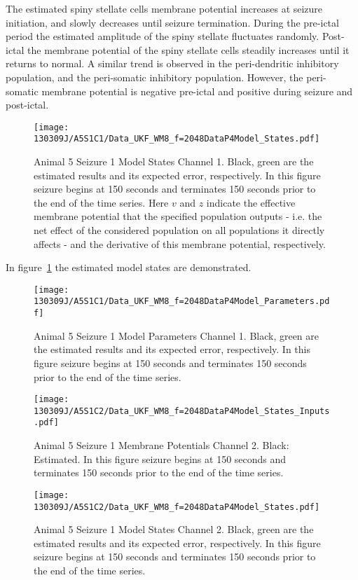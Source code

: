The estimated spiny stellate cells membrane potential increases at seizure initiation, and slowly decreases until seizure termination. During the pre-ictal period the estimated amplitude of the spiny stellate fluctuates randomly. Post-ictal the membrane potential of the spiny stellate cells steadily increases until it returns to normal. A similar trend is observed in the peri-dendritic inhibitory population, and the peri-somatic inhibitory population. However, the peri-somatic membrane potential is negative pre-ictal and positive during seizure and post-ictal.

\begin{figure}
	\centering
		\texttt{[image: 130309J/A5S1C1/Data\_UKF\_WM8\_f=2048DataP4Model\_States.pdf]}
	\caption{Animal 5 Seizure 1 Model States Channel 1. Black, green are the estimated results and its expected error, respectively. In this figure seizure begins at 150 seconds and terminates 150 seconds prior to the end of the time series. Here $v$ and $z$ indicate the effective membrane potential that the specified population outputs - i.e. the net effect of the considered population on all populations it directly affects - and the derivative of this membrane potential, respectively.}
	\label{fig: A5S1C1 MS}
\end{figure}

In figure~\ref{fig: A5S1C1 MS} the estimated model states are demonstrated. 

\begin{figure}
	\centering
		\texttt{[image: 130309J/A5S1C1/Data\_UKF\_WM8\_f=2048DataP4Model\_Parameters.pdf]}
	\caption{Animal 5 Seizure 1 Model Parameters Channel 1. Black, green are the estimated results and its expected error, respectively. In this figure seizure begins at 150 seconds and terminates 150 seconds prior to the end of the time series.}
	\label{fig: A5S1C1 MP}
\end{figure}

\begin{figure}
	\centering
		\texttt{[image: 130309J/A5S1C2/Data\_UKF\_WM8\_f=2048DataP4Model\_States\_Inputs.pdf]}
	\caption{Animal 5 Seizure 1 Membrane Potentials Channel 2. Black: Estimated. In this figure seizure begins at 150 seconds and terminates 150 seconds prior to the end of the time series.}
	\label{fig: A5S1C2 PP}
\end{figure}

\begin{figure}
	\centering
		\texttt{[image: 130309J/A5S1C2/Data\_UKF\_WM8\_f=2048DataP4Model\_States.pdf]}
	\caption{Animal 5 Seizure 1 Model States Channel 2. Black, green are the estimated results and its expected error, respectively. In this figure seizure begins at 150 seconds and terminates 150 seconds prior to the end of the time series.}
	\label{fig: A5S1C2 MS}
\end{figure}

